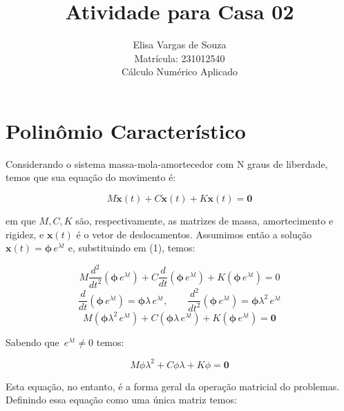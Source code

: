 \documentclass[12pt,a4paper]{article}
\title{
    \vspace{-1.5cm}
    \textbf{Atividade para Casa 02} \\}
\author{Elisa Vargas de Souza \\ Matrícula: 231012540 \\[0.3cm]
    Cálculo Numérico Aplicado \\}
\begin{document}
\maketitle

\section{Polinômio Característico}

Considerando o sistema massa-mola-amortecedor com N graus de liberdade, temos que sua equação do movimento é:

\begin{equation}
    M\ddot{\mathbf{x}}(t) + C\dot{\mathbf{x}}(t) + K\mathbf{x}(t) = \mathbf{0}
    \label{eq:eom}
\end{equation}

\noindent em que $M, C, K$ são, respectivamente, as
matrizes de massa, amortecimento e rigidez, e $\mathbf{x}(t)$ é o vetor de deslocamentos. Assumimos então a solução $\mathbf{x}(t) = \boldsymbol{\phi}\, e^{\lambda t}$ e, substituindo em (1), temos:

\begin{equation}
    M\frac{d^2}{dt^2}(\boldsymbol{\phi}\, e^{\lambda t}) + C\frac{d}{dt}(\boldsymbol{\phi}\, e^{\lambda t}) + K(\boldsymbol{\phi}\, e^{\lambda t}) = 0
\end{equation}
\begin{equation}
    \frac{d}{dt}(\boldsymbol{\phi}\, e^{\lambda t}) = \boldsymbol{\phi}\lambda\, e^{\lambda t}, \qquad
    \frac{d^2}{dt^2}(\boldsymbol{\phi}\, e^{\lambda t}) = \boldsymbol{\phi}\lambda^2\, e^{\lambda t}
\end{equation}
\begin{equation}
    M(\boldsymbol{\phi}\lambda^2\, e^{\lambda t}) + C(\boldsymbol{\phi}\lambda\, e^{\lambda t}) + K(\boldsymbol{\phi}\, e^{\lambda t}) = \mathbf{0}
    \label{eq:eom}
\end{equation}

\noindent Sabendo que $\, e^{\lambda t}\neq0$ temos:

\begin{equation}
    M\phi\lambda^2 + C\phi\lambda + K\phi = \mathbf{0}
    \label{eq:eom}
\end{equation}

\noindent Esta equação, no entanto, é a forma geral da operação matricial do problemas. Definindo essa equação como uma única matriz temos:
\end{document}
